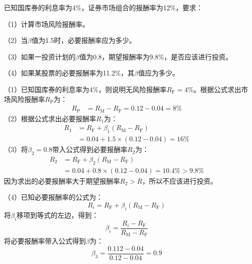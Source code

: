 \documentclass[
  10pt,
  twoside,
  openany,
  b5paper, %
  colorscheme = black, %
  xits = false,
]{qyxf-book}
\begin{document}
 已知国库券的利息率为4\%，证券市场组合的报酬率为12\%，要求：

（1）计算市场风险报酬率。

（2）当$\beta$值为1.5时，必要报酬率应为多少。

（3）如果一投资计划的$\beta$值为0.8，期望报酬率为9.8\%，是否应该进行投资。

（4）如果某股票的必要报酬率为11.2\%，其$\beta$值应为多少。

\begin{note}
	（1）已知国库券的利息率为4\%，则说明无风险报酬率$R_\mathrm{F} = 4\%$。根据公式求出市场风险报酬率$R_\mathrm{P}$为：
	\begin{equation*}
		\begin{aligned}
				R_\mathrm{P} &= R_\mathrm{M} - R_\mathrm{F} =0.12 - 0.04 =8\%
		\end{aligned}
	\end{equation*}
	（2）根据公式求出必要报酬率$R_1$为：
	\begin{equation*}
		\begin{aligned}
			R_1 &= R_\mathrm{F} + \beta_1 (R_\mathrm{M} - R_\mathrm{F}) \\
			&= 0.04 + 1.5 \times (0.12-0.04) = 16\%
		\end{aligned}
	\end{equation*}
	（3）将$\beta_2 =0.8$带入公式得到必要报酬率$R_2$为：
	\begin{equation*}
		\begin{aligned}
			R_2 &= R_\mathrm{F} + \beta_2 (R_\mathrm{M} - R_\mathrm{F}) \\
			&= 0.04 + 0.8 \times (0.12-0.04) = 10.4\% > 9.8\%
		\end{aligned}
	\end{equation*}
	因为求出的必要报酬率大于期望报酬率$R_2 > \overline{R}$，所以不应该进行投资。
	
	（4）已知必要报酬率的公式为：
	\begin{equation*}
		R_i = R_\mathrm{F} + \beta_i (R_\mathrm{M}- R_\mathrm{F})
	\end{equation*}
	将$\beta_i$移项到等式的左边，得到：
	\begin{equation*}
		\beta_i = \frac{R_i-R_\mathrm{F}}{R_\mathrm{M}-R_\mathrm{F}}
	\end{equation*}
	将必要报酬率带入公式得到$\beta$为：
	\begin{equation*}
		\beta_3 = \frac{0.112-0.04}{0.12-0.04} = 0.9
	\end{equation*}
\end{note}
	
\end{document}
